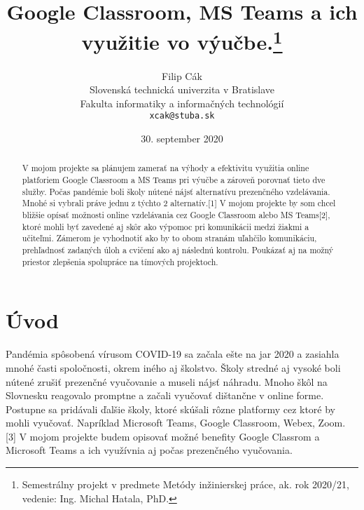 \documentclass[10pt,twoside,slovak,a4paper]{article}
\title{Google Classroom,  MS Teams a ich využitie vo výučbe.\thanks{Semestrálny projekt v predmete Metódy inžinierskej práce, ak. rok 2020/21, vedenie: Ing. Michal Hatala, PhD. }}
\author{Filip Cák\\[2pt]
	{\small Slovenská technická univerzita v Bratislave}\\
	{\small Fakulta informatiky a informačných technológií}\\
	{\small \texttt{xcak@stuba.sk}}
	}
\date{\small 30. september 2020} %
\begin{document}
\maketitle

\begin{abstract}
V mojom projekte sa plánujem zamerať na výhody a efektivitu využitia online platforiem Google Classroom a MS Teams pri výučbe a zároveň porovnať tieto dve služby. Počas pandémie boli školy nútené nájsť alternatívu prezenčného vzdelávania. Mnohé si vybrali práve jednu z týchto 2 alternatív.[1] V mojom projekte by som chcel bližšie opísať možnosti online vzdelávania cez Google Classroom alebo MS Teams[2], ktoré mohli byť zavedené aj skôr ako výpomoc pri komunikácii medzi žiakmi a učiteľmi. Zámerom je vyhodnotiť ako by to obom stranám uľahčilo komunikáciu, prehľadnosť zadaných úloh a cvičení ako aj následnú kontrolu. Poukázať aj na možný priestor zlepšenia spolupráce na tímových projektoch.
\end{abstract}



\section{Úvod}

Pandémia spôsobená vírusom COVID-19 sa začala ešte na jar 2020 a zasiahla mnohé časti spoločnosti, okrem iného aj školstvo. Školy stredné aj vysoké boli nútené zrušiť prezenčné vyučovanie a museli nájsť náhradu. Mnoho škôl na Slovnesku reagovalo promptne a začali vyučovať dištančne v online forme. Postupne sa pridávali ďalšie školy, ktoré skúšali rôzne platformy cez ktoré by mohli vyučovať. Napríklad Microsoft Teams, Google Classroom, Webex, Zoom. [3] V mojom projekte budem opisovať možné benefity Google Classrom a Microsoft Teams a ich využívnia aj počas prezenčného vyučovania.
 


\end{document}
